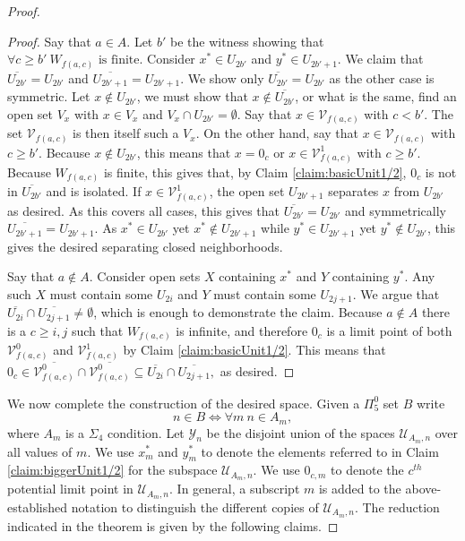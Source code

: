 \documentclass[11pt]{amsart}
\theoremstyle{remark}
\begin{document}
\begin{proof}
    \begin{proof}
    Say that $a\in A$.
    Let $b'$ be the witness showing that $\forall c\geq b'~W_{f(a,c)} \text{ is finite.}$
    Consider $x^*\in U_{2b'}$ and $y^*\in U_{2b'+1}$.
    We claim that $\overline{U_{2b'}}=U_{2b'}$ and $\overline{U_{2b'+1}}=U_{2b'+1}$.
    We show only $\overline{U_{2b'}}=U_{2b'}$ as the other case is symmetric.
    Let $x\not\in U_{2b'}$, we must show that $x\not\in\overline{U_{2b'}}$, or what is the same, find an open set $V_x$ with $x\in V_x$ and $V_x\cap U_{2b'}=\emptyset$.
    Say that $x\in \mathcal{V}_{f(a,c)}$ with $c<b'$.
    The set $\mathcal{V}_{f(a,c)}$ is then itself such a $V_x$.
    On the other hand, say that $x\in \mathcal{V}_{f(a,c)}$ with $c\geq b'$.
    Because $x\not\in U_{2b'}$, this means that $x=0_c$ or $x\in \mathcal{V}_{f(a,c)}^1$ with $c\geq b'$.
    Because $W_{f(a,c)}$ is finite, this gives that, by Claim \ref{claim:basicUnit1/2}, $0_c$ is not in $\overline{U_{2b'}}$ and is isolated.
    If $x\in \mathcal{V}_{f(a,c)}^1$, the open set $U_{2b'+1}$ separates $x$ from $U_{2b'}$ as desired.
    As this covers all cases, this gives that $\overline{U_{2b'}}=U_{2b'}$ and symmetrically $\overline{U_{2b'+1}}=U_{2b'+1}$.
    As $x^*\in U_{2b'}$ yet $x^*\not\in U_{2b'+1}$ while $y^*\in U_{2b'+1}$ yet $y^*\not\in U_{2b'}$, this gives the desired separating closed neighborhoods.

    Say that $a\not\in A$.
    Consider open sets $X$ containing $x^*$ and $Y$ containing $y^*$.
    Any such $X$ must contain some $U_{2i}$ and $Y$ must contain some $U_{2j+1}$.
    We argue that $\overline{U_{2i}}\cap \overline{U_{2j+1}}\neq \emptyset$, which is enough to demonstrate the claim.
    Because $a\not\in A$ there is a $c\geq i,j$ such that $W_{f(a,c)}$ is infinite, and therefore $0_c$ is a limit point of both $\mathcal{V}_{f(a,c)}^0$ and $\mathcal{V}_{f(a,c)}^1$ by Claim \ref{claim:basicUnit1/2}.
    This means that $0_c\in \overline{\mathcal{V}_{f(a,c)}^0}\cap\overline{\mathcal{V}_{f(a,c)}^0}\subseteq\overline{U_{2i}}\cap \overline{U_{2j+1}},$ as desired.
    \end{proof}

    

    We now complete the construction of the desired space.
    Given a $\Pi_5^0$ set $B$ write
    \[n\in B \iff \forall m ~ n\in A_m,\]
    where $A_m$ is a $\Sigma_4$ condition.
    Let $\mathcal{Y}_n$ be the disjoint union of the spaces $\mathcal{U}_{A_m,n}$ over all values of $m$.
    We use $x^*_m$ and $y^*_m$ to denote the elements referred to in Claim \ref{claim:biggerUnit1/2} for the subspace $\mathcal{U}_{A_m,n}$.
    We use $0_{c,m}$ to denote the $c^{th}$ potential limit point in $\mathcal{U}_{A_m,n}$.
    In general, a subscript $m$ is added to the above-established notation to distinguish the different copies of $\mathcal{U}_{A_m,n}$.
    The reduction indicated in the theorem is given by the following claims.


\end{proof}
\end{document}
